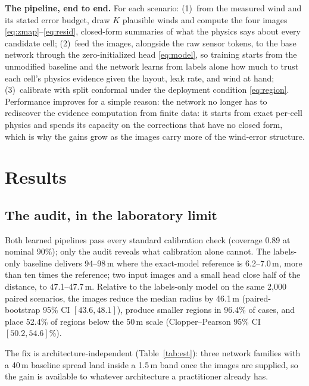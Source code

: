 \documentclass[conference]{IEEEtran}
\begin{document}
\textbf{The pipeline, end to end.} For each scenario:
(1)~from the measured wind and its stated error budget, draw $K$
plausible winds and compute the four images
\eqref{eq:zmap}--\eqref{eq:resid}, closed-form summaries of what the
physics says about every candidate cell; (2)~feed the images, alongside
the raw sensor tokens, to the base network through the zero-initialized
head \eqref{eq:model}, so training starts from the unmodified baseline
and the network learns from labels alone how much to trust each cell's
physics evidence given the layout, leak rate, and wind at hand;
(3)~calibrate with split conformal under the deployment condition
\eqref{eq:region}. Performance improves for a simple reason: the
network no longer has to rediscover the evidence computation from
finite data: it starts from exact per-cell physics and spends its
capacity on the corrections that have no closed form, which is why the
gains grow as the images carry more of the wind-error structure.


\section{Results}
\subsection{The audit, in the laboratory limit}
\label{sec:est}
Both learned pipelines pass every standard calibration check (coverage
0.89 at nominal 90\%); only the audit reveals what calibration alone
cannot. The labels-only baseline delivers 94--98\,m where the
exact-model reference is 6.2--7.0\,m, more than ten times the
reference; two input images and a small head close half of the
distance, to 47.1--47.7\,m. Relative to the labels-only
model on the same 2{,}000 paired scenarios, the images reduce the median
radius by 46.1\,m (paired-bootstrap 95\% CI $[43.6, 48.1]$), produce
smaller regions in 96.4\% of cases, and place 52.4\% of regions below
the 50\,m scale (Clopper--Pearson 95\% CI $[50.2, 54.6]$\%).

The fix is architecture-independent (Table~\ref{tab:est}): three
network families with a 40\,m baseline spread land inside a 1.5\,m
band once the images are supplied, so the gain is available to whatever
architecture a practitioner already has.
\end{document}
